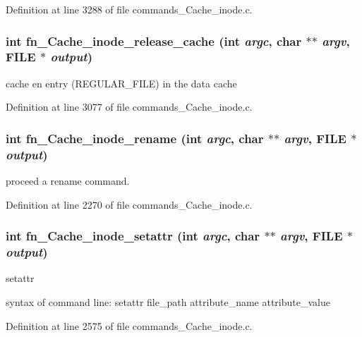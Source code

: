 Definition at line 3288 of file commands\_\-Cache\_\-inode.c.
\subsubsection[{fn\_\-Cache\_\-inode\_\-release\_\-cache}]{\setlength{\rightskip}{0pt plus 5cm}int fn\_\-Cache\_\-inode\_\-release\_\-cache (int {\em argc}, \/  char $\ast$$\ast$ {\em argv}, \/  FILE $\ast$ {\em output})}\label{commands_8h_a203776f9d299bcef300c35f1be807411}
cache en entry (REGULAR\_\-FILE) in the data cache 

Definition at line 3077 of file commands\_\-Cache\_\-inode.c.
\subsubsection[{fn\_\-Cache\_\-inode\_\-rename}]{\setlength{\rightskip}{0pt plus 5cm}int fn\_\-Cache\_\-inode\_\-rename (int {\em argc}, \/  char $\ast$$\ast$ {\em argv}, \/  FILE $\ast$ {\em output})}\label{commands_8h_a616439560ee7cd599d64c3de8b55b36d}
proceed a rename command. 

Definition at line 2270 of file commands\_\-Cache\_\-inode.c.
\subsubsection[{fn\_\-Cache\_\-inode\_\-setattr}]{\setlength{\rightskip}{0pt plus 5cm}int fn\_\-Cache\_\-inode\_\-setattr (int {\em argc}, \/  char $\ast$$\ast$ {\em argv}, \/  FILE $\ast$ {\em output})}\label{commands_8h_a9e606e96829ada43c70f227cd6b9cd52}
setattr

syntax of command line: setattr file\_\-path attribute\_\-name attribute\_\-value 

Definition at line 2575 of file commands\_\-Cache\_\-inode.c.
